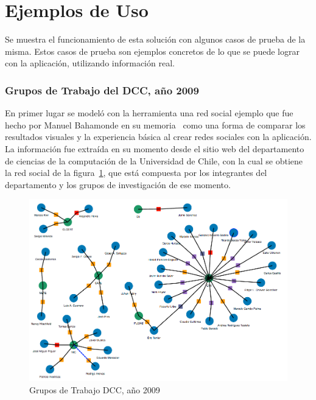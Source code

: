 
\section{Ejemplos de Uso} %
\label{sec:ejemplos_de_uso}

Se muestra el funcionamiento de esta solución con algunos casos de prueba de la misma. Estos casos de prueba son ejemplos concretos de lo que se puede lograr con la aplicación, utilizando información real.

\subsubsection{Grupos de Trabajo del DCC, año 2009} %
\label{ssub:grupos_de_trabajo_del_dcc_2009}

En primer lugar se modeló con la herramienta una red social ejemplo que fue hecho por Manuel Bahamonde en su memoria~\cite{memoriamanuel} como una forma de comparar los resultados visuales y la experiencia básica al crear redes sociales con la aplicación.\\

La información fue extraída en su momento desde el sitio web del departamento de ciencias de la computación de la Universidad de Chile, con la cual se obtiene la red social de la figura~\ref{grupos_de_trabajo_dcc}, que está compuesta por los integrantes del departamento y los grupos de investigación de ese momento.

\begin{figure}[H]
  \centering
  \includegraphics[width=1.0\textwidth]{images/grupos_de_trabajo_dcc.png}
  \caption{Grupos de Trabajo DCC, año 2009}
  \label{grupos_de_trabajo_dcc}
\end{figure}



